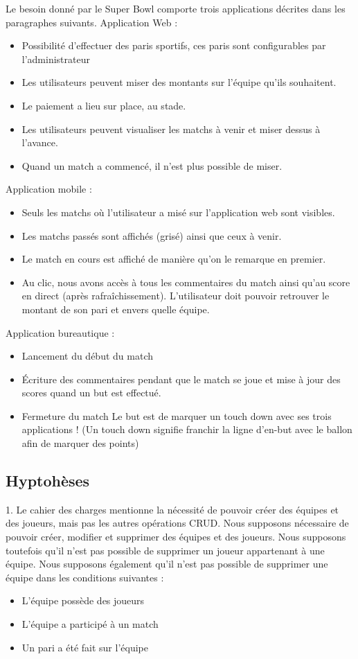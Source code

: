 \documentclass{book}
\begin{document}
Le besoin donné par le Super Bowl comporte trois applications décrites dans les paragraphes suivants.
Application Web :
\begin{itemize}
    \item	Possibilité d'effectuer des paris sportifs, ces paris sont configurables par l'administrateur
    \item	Les utilisateurs peuvent miser des montants sur l'équipe qu'ils souhaitent.
    \item	Le paiement a lieu sur place, au stade.
    \item	Les utilisateurs peuvent visualiser les matchs à venir et miser dessus à l'avance.
    \item	Quand un match a commencé, il n'est plus possible de miser.
\end{itemize}
Application mobile :
\begin{itemize}
    \item	Seuls les matchs où l'utilisateur a misé sur l'application web sont visibles.
    \item	Les matchs passés sont affichés (grisé) ainsi que ceux à venir.
    \item	Le match en cours est affiché de manière qu'on le remarque en premier.
    \item	Au clic, nous avons accès à tous les commentaires du match ainsi qu'au score en direct (après rafraîchissement). L'utilisateur doit pouvoir retrouver le montant de son pari et envers quelle équipe.
\end{itemize}
Application bureautique :
\begin{itemize}
    \item	Lancement du début du match
    \item	Écriture des commentaires pendant que le match se joue et mise à jour des scores quand un but est effectué.
    \item	Fermeture du match
Le but est de marquer un touch down avec ses trois applications ! (Un touch down signifie franchir la ligne d'en-but avec le ballon afin de marquer des points)
\end{itemize}

\subsection{Hyptohèses}

1. Le cahier des charges mentionne la nécessité de pouvoir créer des équipes et des joueurs, mais pas les autres opérations CRUD. 
Nous supposons nécessaire de pouvoir créer, modifier et supprimer des équipes et des joueurs.
Nous supposons toutefois qu'il n'est pas possible de supprimer un joueur appartenant à une équipe.
Nous supposons également qu'il n'est pas possible de supprimer une équipe dans les conditions suivantes :
\begin{itemize}
    \item L'équipe possède des joueurs
    \item L'équipe a participé à un match
    \item Un pari a été fait sur l'équipe
\end{itemize}
\end{document}
